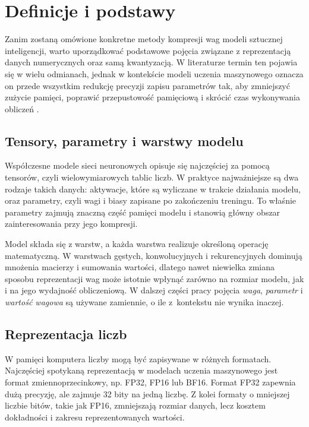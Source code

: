 \section{Definicje i podstawy}

Zanim zostaną omówione konkretne metody kompresji wag modeli sztucznej inteligencji, warto uporządkować podstawowe pojęcia związane z reprezentacją danych numerycznych oraz samą kwantyzacją. W literaturze termin ten pojawia się w wielu odmianach, jednak w kontekście modeli uczenia maszynowego oznacza on przede wszystkim redukcję precyzji zapisu parametrów tak, aby zmniejszyć zużycie pamięci, poprawić przepustowość pamięciową i skrócić czas wykonywania obliczeń \cite{jacob2017quantization,dettmers2023case4bit}.

\subsection{Tensory, parametry i warstwy modelu}

Współczesne modele sieci neuronowych opisuje się najczęściej za pomocą tensorów, czyli wielowymiarowych tablic liczb. W praktyce najważniejsze są dwa rodzaje takich danych: aktywacje, które są wyliczane w trakcie działania modelu, oraz parametry, czyli wagi i biasy zapisane po zakończeniu treningu. To właśnie parametry zajmują znaczną część pamięci modelu i stanowią główny obszar zainteresowania przy jego kompresji.

Model składa się z warstw, a każda warstwa realizuje określoną operację matematyczną. W warstwach gęstych, konwolucyjnych i rekurencyjnych dominują mnożenia macierzy i sumowania wartości, dlatego nawet niewielka zmiana sposobu reprezentacji wag może istotnie wpłynąć zarówno na rozmiar modelu, jak i na jego wydajność obliczeniową. W dalszej części pracy pojęcia \textit{waga}, \textit{parametr} i \textit{wartość wagowa} są używane zamiennie, o ile z~kontekstu nie wynika inaczej.

\subsection{Reprezentacja liczb}

W pamięci komputera liczby mogą być zapisywane w różnych formatach. Najczęściej spotykaną reprezentacją w modelach uczenia maszynowego jest format zmiennoprzecinkowy, np. FP32, FP16 lub BF16. Format FP32 zapewnia dużą precyzję, ale zajmuje 32 bity na jedną liczbę. Z kolei formaty o mniejszej liczbie bitów, takie jak FP16, zmniejszają rozmiar danych, lecz kosztem dokładności i zakresu reprezentowanych wartości.

